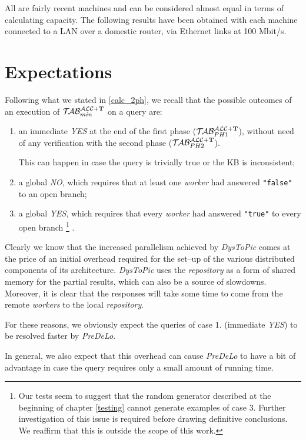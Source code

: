 \documentclass[a4paper, 11pt, oneside]{duthesis}
\newcommand{\tip}{{\bf T}}
\newcommand{\nuovoc}{\mathrel{{\mathcal{T}\!\mathcal{AB}}}_{min}^{\mathcal{ALC}+\mbox{\scriptsize $\tip$}}}
\newcommand{\primo}{\mathrel{{\mathcal{T}\!\mathcal{AB}}}_{PH 1}^{\mathcal{ALC}+\mbox{\scriptsize $\tip$}}}
\newcommand{\secondo}{\mathrel{{\mathcal{T}\!\mathcal{AB}}}_{PH 2}^{\mathcal{ALC}+\mbox{\scriptsize $\tip$}}}
\begin{document}
All are fairly recent machines and can be considered almost equal in terms of calculating capacity.
The following results have been obtained with each machine connected to a LAN over a domestic router, via Ethernet links at 100 Mbit/s.

\newpage

\section{Expectations}\label{expectations}
Following what we stated in \ref{calc_2ph}, we recall that the possible outcomes of an execution of $\nuovoc$ on a query are:
\begin{enumerate}
\item an immediate \emph{YES} at the end of the first phase ($\primo$), without need of any verification with the second phase ($\secondo$).

This can happen in case the query is trivially true or the KB is inconsistent;

\item a global \emph{NO}, which requires that at least one \emph{worker} had answered \texttt{"false"} to an open branch;

\item a global \emph{YES}, which requires that every \emph{worker} had answered \texttt{"true"} to every open branch
\footnote{Our tests seem to suggest that the random generator described at the beginning of chapter \ref{testing} cannot generate examples of case 3. Further investigation of this issue is required before drawing definitive conclusions. We reaffirm that this is outside the scope of this work.}
.
\end{enumerate}

Clearly we know that the increased parallelism achieved by \emph{DysToPic} comes at the price of an initial overhead required for the set--up of the various distributed components of its architecture.
\emph{DysToPic} uses the \emph{repository} as a form of shared memory for the partial results, which can also be a source of slowdowns.
Moreover, it is clear that the responses will take some time to come from the remote \emph{workers} to the local \emph{repository}.

For these reasons, we obviously expect the queries of case 1. (immediate \emph{YES}) to be resolved faster by \emph{PreDeLo}.

In general, we also expect that this overhead can cause \emph{PreDeLo} to have a bit of advantage in case the  query requires only a small amount of running time.
\end{document}
